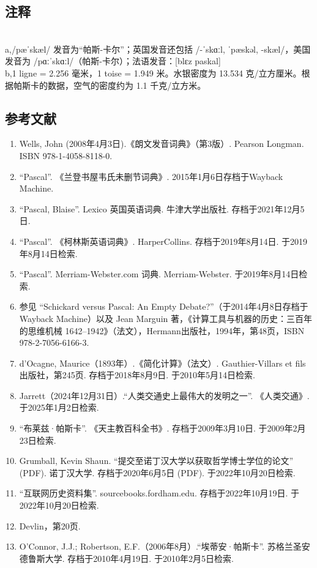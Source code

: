 \subsection{注释}\\
a,/pæˈskæl/ 发音为“帕斯-卡尔”；英国发音还包括 /-ˈskɑːl, ˈpæskəl, -skæl/，美国发音为 /pɑːˈskɑːl/（帕斯-卡尔）；法语发音：[blɛz paskal]\\
b,1 ligne = 2.256 毫米，1 toise = 1.949 米。水银密度为 13.534 克/立方厘米。根据帕斯卡的数据，空气的密度约为 1.1 千克/立方米。\\
\subsection{参考文献}
\begin{enumerate}
\item Wells, John (2008年4月3日).《朗文发音词典》（第3版）. Pearson Longman. ISBN 978-1-4058-8118-0.
\item “Pascal”. 《兰登书屋韦氏未删节词典》. 2015年1月6日存档于Wayback Machine.
\item “Pascal, Blaise”. Lexico 英国英语词典. 牛津大学出版社. 存档于2021年12月5日.
\item “Pascal”. 《柯林斯英语词典》. HarperCollins. 存档于2019年8月14日. 于2019年8月14日检索.
\item “Pascal”. Merriam-Webster.com 词典. Merriam-Webster. 于2019年8月14日检索.
\item 参见 “Schickard versus Pascal: An Empty Debate?”（于2014年4月8日存档于Wayback Machine）以及 Jean Marguin 著，《计算工具与机器的历史：三百年的思维机械 1642–1942》（法文），Hermann出版社，1994年，第48页，ISBN 978-2-7056-6166-3.
\item d'Ocagne, Maurice（1893年）.《简化计算》（法文）. Gauthier-Villars et fils出版社，第245页. 存档于2018年8月9日. 于2010年5月14日检索.
\item Jarrett（2024年12月31日）.“人类交通史上最伟大的发明之一”. 《人类交通》. 于2025年1月2日检索.
\item “布莱兹·帕斯卡”. 《天主教百科全书》. 存档于2009年3月10日. 于2009年2月23日检索.
\item Grumball, Kevin Shaun. “提交至诺丁汉大学以获取哲学博士学位的论文” (PDF). 诺丁汉大学. 存档于2020年6月5日 (PDF). 于2022年10月20日检索.
\item “互联网历史资料集”. sourcebooks.fordham.edu. 存档于2022年10月19日. 于2022年10月20日检索.
\item Devlin，第20页.
\item O'Connor, J.J.; Robertson, E.F.（2006年8月）.“埃蒂安·帕斯卡”. 苏格兰圣安德鲁斯大学. 存档于2010年4月19日. 于2010年2月5日检索.

\end{enumerate}
